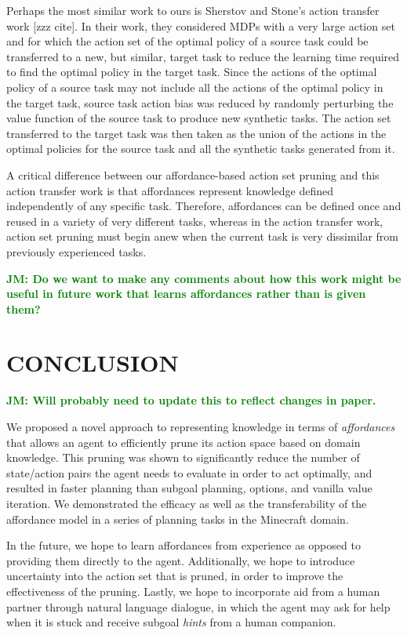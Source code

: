 \documentclass[]{article}
\newcommand{\jmnote}[1]{\textcolor{Green}{\textbf{JM: #1}}}
\begin{document}
Perhaps the most similar work to ours is Sherstov and Stone's action transfer work [zzz cite].
In their work, they considered MDPs with a very large action set and for which the action
set of the optimal policy of a source task could be transferred to a new, but similar, target
task to reduce the learning time required to find the optimal policy in the target task. Since the actions
of the optimal policy of a source task may not include all the actions of the optimal policy
in the target task, source task action bias was reduced by randomly perturbing the value function
of the source task to produce new synthetic tasks. The action set transferred to the target task
was then taken as the union of the actions in the optimal policies for the source task and all the
synthetic tasks generated from it.

A critical difference between our affordance-based action set pruning and this action transfer
work is that affordances represent knowledge defined independently of any specific task. Therefore,
affordances can be defined once and reused in a variety of very different tasks, whereas in the action transfer work, action set pruning
must begin anew when the current task is very dissimilar from previously experienced tasks.

\jmnote{Do we want to make any comments about how this work might be useful in future work that learns
affordances rather than is given them?}



\section{CONCLUSION}
\jmnote{Will probably need to update this to reflect changes in paper.}

We proposed a novel approach to representing knowledge in terms of
{\em affordances}~\citep{gibson77} that allows an agent to efficiently
prune its action space based on domain knowledge. This pruning was
shown to significantly reduce the number of state/action pairs the
agent needs to evaluate in order to act optimally, and resulted in
faster planning than subgoal planning, options, and vanilla value
iteration. We demonstrated the efficacy as well as the transferability
of the affordance model in a series of planning tasks in the Minecraft
domain.

In the future, we hope to learn affordances from experience as opposed
to providing them directly to the agent. Additionally, we hope to
introduce uncertainty into the action set that is pruned, in order to
improve the effectiveness of the pruning. Lastly, we hope to
incorporate aid from a human partner through natural language
dialogue, in which the agent may ask for help when it is stuck and
receive subgoal {\it hints} from a human companion.


  
\end{document}
